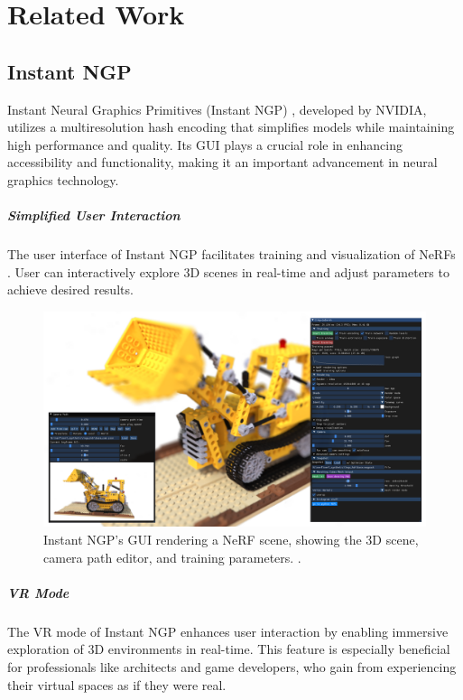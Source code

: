 %
\chapter{Related Work}
\label{sec:related}

\section{Instant NGP}

Instant Neural Graphics Primitives (Instant NGP) \cite{muller_instant_2022}, developed by NVIDIA, utilizes a multiresolution hash encoding that simplifies models while maintaining high performance and quality.
Its GUI plays a crucial role in enhancing accessibility and functionality, making it an important advancement in neural graphics technology.

\paragraph{Simplified User Interaction}
The user interface of Instant NGP facilitates training and visualization of NeRFs .
User can interactively explore 3D scenes in real-time and adjust parameters to achieve desired results.

\begin{figure}[h!]
  \centering
  \includegraphics[width=\textwidth]{figures/realted-instant-ngp.png}
  \caption{Instant NGP's GUI rendering a NeRF scene, showing the 3D scene, camera path editor, and training parameters.
   \cite{muller_instant_2022}.}
  \label{fig:instant-ngp}
\end{figure}

\paragraph{VR Mode}
The VR mode of Instant NGP enhances user interaction by enabling immersive exploration of 3D environments in real-time.
This feature is especially beneficial for professionals like architects and game developers, who gain from experiencing their virtual spaces as if they were real.

